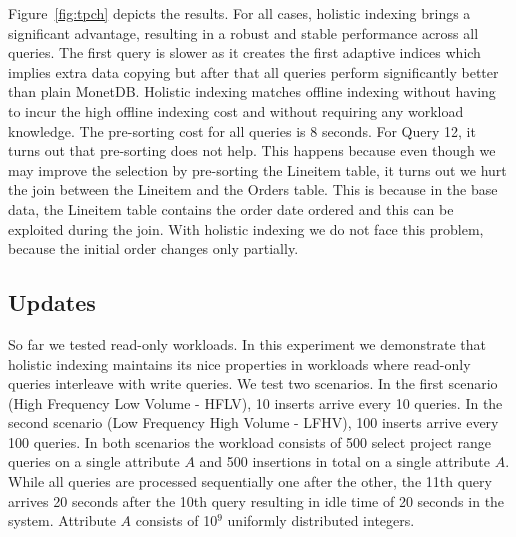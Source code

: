 Figure~\ref{fig:tpch} depicts the results.
For all cases, holistic indexing brings a significant advantage, resulting in a robust and stable 
performance across all queries.
The first query is slower as it creates the first adaptive indices which implies extra data copying
but after that all queries perform significantly better than plain MonetDB.
Holistic indexing matches offline  indexing without having to incur the high offline indexing cost
and without requiring any workload knowledge.
The pre-sorting cost for all queries is 8 seconds.
For Query 12, it turns out that pre-sorting does not help.
This happens because even though we may improve the selection by pre-sorting the Lineitem table,
it turns out we hurt the join between the Lineitem and the Orders table.
This is because in the base data, the Lineitem table contains 
the order date ordered and this can be exploited during the join.
With holistic indexing we do not face this problem, because the initial order changes only partially.


\subsection{Updates}
\label{subsec:updates}

So far we tested read-only workloads. 
In this experiment we demonstrate that holistic indexing maintains its nice properties  
in workloads where read-only queries interleave with write queries.
We test two scenarios.
In the first scenario (High Frequency Low Volume - HFLV), 10 inserts arrive every 10 queries.
In the second scenario (Low Frequency High Volume - LFHV), 100 inserts arrive every  100 queries.
In both scenarios the workload consists of 500 select project range queries on a single attribute $A$ and 500 insertions in total on a single attribute $A$.
While all queries are processed sequentially one after the other, the 11th query arrives 20 seconds after the 10th query resulting in idle time of 20 seconds in the system.
Attribute $A$ consists of 10$^{9}$ uniformly distributed integers.

